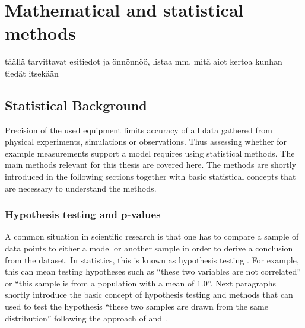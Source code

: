 \documentclass[english, oneside]{HYgradu}
\begin{document}
\chapter{Mathematical and statistical methods}
täällä tarvittavat esitiedot ja önnönnöö, listaa mm. mitä aiot kertoa kunhan tiedät itsekään

\section{Statistical Background}

Precision of the used equipment limits accuracy of all data gathered from physical experiments, simulations or observations. Thus assessing whether for example measurements support a model requires using statistical methods. The main methods relevant for this thesis are covered here. The methods are shortly introduced in the following sections together with basic statistical concepts that are necessary to understand the methods. 



\subsection{Hypothesis testing and p-values}
A common situation in scientific research is that one has to compare a sample of data points to either a model or another sample in order to derive a conclusion from the dataset. In statistics, this is known as hypothesis testing \citep{wall2003practical}. For example, this can mean testing hypotheses such as ``these two variables are not correlated'' or ``this sample is from a population with a mean of 1.0''. Next paragraphs shortly introduce the basic concept of hypothesis testing and methods that can used to test the hypothesis ``these two samples are drawn from the same distribution'' following the approach of \citet{bohm2010introduction} and \citet{wall2003practical}.
\end{document}
